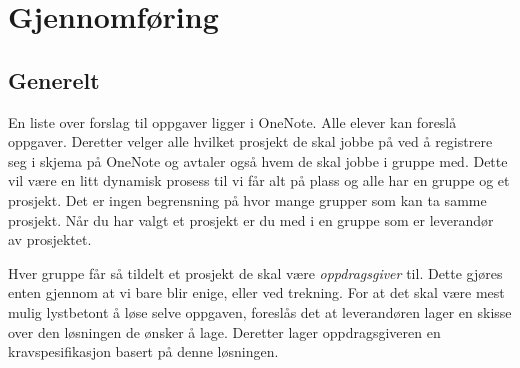 \documentclass[11pt]{article} %
\begin{document}
\section{Gjennomføring}
    \subsection{Generelt}
        En liste over forslag til oppgaver ligger i OneNote. Alle elever kan foreslå oppgaver. Deretter velger alle hvilket prosjekt de skal jobbe på ved å registrere seg i skjema på OneNote og avtaler også hvem de skal jobbe i gruppe med. Dette vil være en litt dynamisk prosess til vi får alt på plass og alle har en gruppe og et prosjekt. Det er ingen begrensning på hvor mange grupper som kan ta samme prosjekt. Når du har valgt et prosjekt er du med i en gruppe som er leverandør av prosjektet.
        
        Hver gruppe får så tildelt et prosjekt de skal være \textit{oppdragsgiver} til. Dette gjøres enten gjennom at vi bare blir enige, eller ved trekning. For at det skal være mest mulig lystbetont å løse selve oppgaven, foreslås det at leverandøren lager en skisse over den løsningen de ønsker å lage. Deretter lager oppdragsgiveren en kravspesifikasjon basert på denne løsningen.
\end{document}
